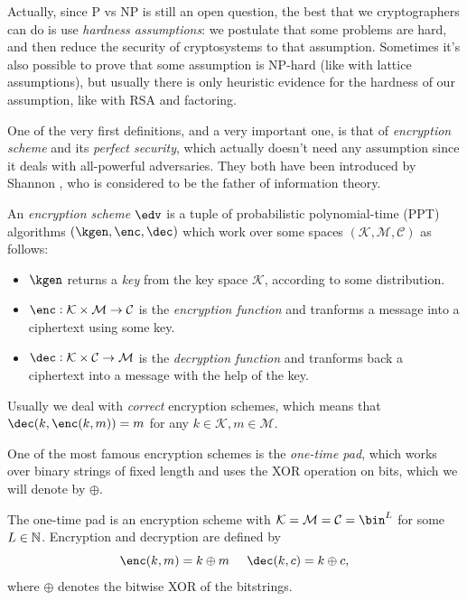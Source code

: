 Actually, since P vs NP is still an open question, the best that we cryptographers can do is use \emph{hardness assumptions}: we postulate that some problems are hard, and then reduce the security of cryptosystems to that assumption. Sometimes it's also possible to prove that some assumption is NP-hard (like with lattice assumptions), but usually there is only heuristic evidence for the hardness of our assumption, like with RSA and factoring.

One of the very first definitions, and a very important one, is that of \emph{encryption scheme} and its \emph{perfect security}, which actually doesn't need any assumption since it deals with all-powerful adversaries. They both have been introduced by Shannon \cite{Shannon}, who is considered to be the father of information theory.

\begin{definition}
    An \emph{encryption scheme} $\edv$ is a tuple of probabilistic polynomial-time (PPT) algorithms $(\kgen,\enc,\dec)$ which work over some spaces $(\mathcal K, \mathcal M, \mathcal C)$ as follows:
    \begin{itemize}
        \item $\kgen$ returns a \emph{key} from the key space $\mathcal K$, according to some distribution.
        \item $\enc:\mathcal K\times\mathcal M\to \mathcal C$ is the \emph{encryption function} and tranforms a message into a ciphertext using some key.
        \item $\dec: \mathcal K\times\mathcal C\to \mathcal M$ is the \emph{decryption function} and tranforms back a ciphertext into a message with the help of the key.
    \end{itemize}
    Usually we deal with \emph{correct} encryption schemes, which means that $\dec(k,\enc(k,m))=m$ for any $k\in\mathcal K,m\in\mathcal M$.
\end{definition}

One of the most famous encryption schemes is the \emph{one-time pad}, which works over binary strings of fixed length and uses the XOR operation on bits, which we will denote by $\oplus$.

\begin{definition}
    The one-time pad is an encryption scheme with $\mathcal K=\mathcal M=\mathcal C=\bin^L$ for some $L\in\mathbb{N}$. Encryption and decryption are defined by
    $$ \enc(k,m)=k\oplus m\;\;\;\;\; \dec(k,c)=k\oplus c,$$
    where $\oplus$ denotes the bitwise XOR of the bitstrings.
\end{definition}

